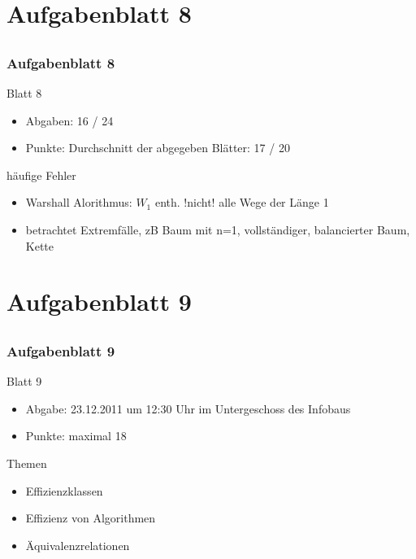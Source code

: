 \section[Rückblick]{Aufgabenblatt 8}
\subsection*{}
\begin{frame}
	\frametitle{Aufgabenblatt 8}
	\begin{block}{Blatt 8}
		\begin{itemize}
			\item Abgaben: 16 / 24
			\item Punkte: Durchschnitt der abgegeben Blätter: 17 / 20
		\end{itemize}
   \end{block}
	\begin{block}{häufige Fehler}
 		\begin{itemize}
 	  		\item[8.1] Warshall Alorithmus: $W_1$ enth. !nicht! alle Wege der Länge 1 \pause
 	  		\item[8.3] betrachtet Extremfälle, zB Baum mit n=1, vollständiger, balancierter Baum, Kette
 	  \end{itemize}
	\end{block}
\end{frame}

\section[Blatt 9]{Aufgabenblatt 9}
\subsection*{}
\begin{frame}
	\frametitle{Aufgabenblatt 9}
	\begin{block}{Blatt 9}
		\begin{itemize}
			\item Abgabe: 23.12.2011 um 12:30 Uhr im Untergeschoss des Infobaus
			\item Punkte: maximal 18
		\end{itemize}
  	\end{block}
	\begin{block}{Themen}
		\begin{itemize}
			\item Effizienzklassen
			\item Effizienz von Algorithmen
			\item Äquivalenzrelationen
	 	\end{itemize}
	\end{block}
\end{frame}
